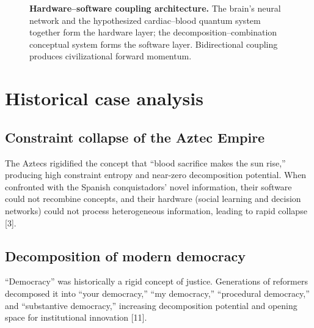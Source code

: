 \documentclass[11pt,a4paper]{article}
\begin{document}
\begin{figure}[htbp]
\centering
{}
\caption{\textbf{Hardware--software coupling architecture.} The brain's neural network and the hypothesized cardiac--blood quantum system together form the hardware layer; the decomposition--combination conceptual system forms the software layer. Bidirectional coupling produces civilizational forward momentum.}
\label{fig:architecture}
\end{figure}

\section{Historical case analysis}

\subsection{Constraint collapse of the Aztec Empire}

The Aztecs rigidified the concept that ``blood sacrifice makes the sun rise,'' producing high constraint entropy and near-zero decomposition potential. When confronted with the Spanish conquistadors' novel information, their software could not recombine concepts, and their hardware (social learning and decision networks) could not process heterogeneous information, leading to rapid collapse [3].

\subsection{Decomposition of modern democracy}

``Democracy'' was historically a rigid concept of justice. Generations of reformers decomposed it into ``your democracy,'' ``my democracy,'' ``procedural democracy,'' and ``substantive democracy,'' increasing decomposition potential and opening space for institutional innovation [11].
\end{document}
